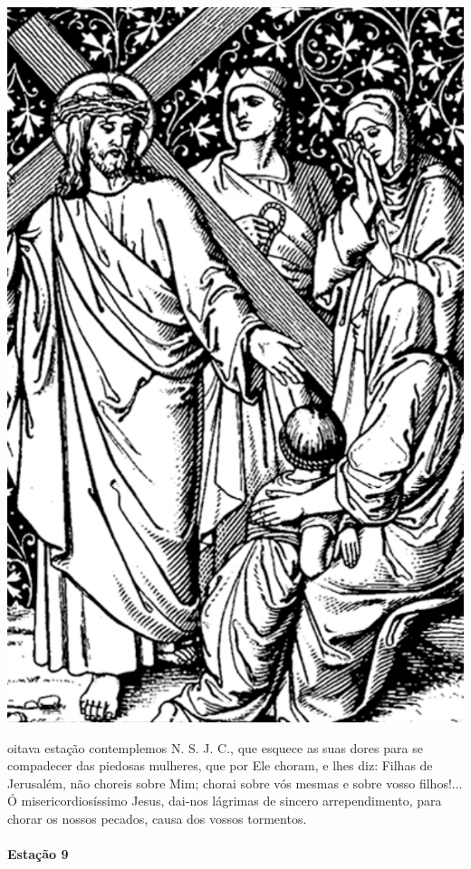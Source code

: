 \begin{nscenter}
\includegraphics[width=.8\textwidth, height=.8\textheight, keepaspectratio]{media/station8}
\end{nscenter}

 oitava estação contemplemos N. S. J. C., que esquece as suas dores para se compadecer das piedosas mulheres, que por Ele choram, e lhes diz: Filhas de Jerusalém, não choreis sobre Mim; chorai sobre vós mesmas e sobre vosso filhos!...
Ó misericordiosíssimo Jesus, dai-nos lágrimas de sincero arrependimento, para chorar os nossos pecados, causa dos vossos tormentos.

\newpage

\paragraph{Estação 9}

